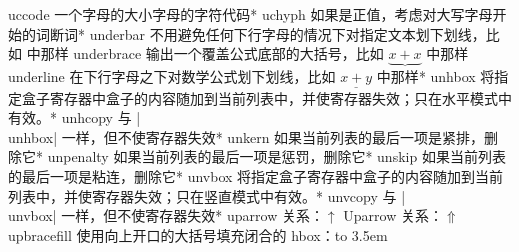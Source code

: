 \capcs uccode {一个字母的大小字母的字符代码}*{}
\capcs uchyph {如果是正值，考虑对大写字母开始的词断词}*{}
\capcs underbar {不用避免任何下行字母的情况下对指定文本划下划线，比如  中那样}{}{}
\capcs underbrace {输出一个覆盖公式底部的大括号，比如 $\underbrace{x+x}{}$ 中那样}{}{}
\capcs underline {在下行字母之下对数学公式划下划线，比如 $\underline{x+y}$ 中那样}*{}
\capcs unhbox {将指定盒子寄存器中盒子的内容随加到当前列表中，并使寄存器失效；只在水平模式中有效。}*{}
\capcs unhcopy {与 |\\unhbox| 一样，但不使寄存器失效}*{}
\capcs unkern {如果当前列表的最后一项是紧排，删除它}*{}
\capcs unpenalty {如果当前列表的最后一项是惩罚，删除它}*{}
\capcs unskip {如果当前列表的最后一项是粘连，删除它}*{}
\capcs unvbox {将指定盒子寄存器中盒子的内容随加到当前列表中，并使寄存器失效；只在竖直模式中有效。}*{}
\capcs unvcopy {与 |\\unvbox| 一样，但不使寄存器失效}*{}
\capcs uparrow {关系：$\uparrow$}{}{}
\capcs Uparrow {关系：$\Uparrow$}{}{}
\capcs upbracefill {使用向上开口的大括号填充闭合的 hbox：\hbox to 3.5em{\upbracefill}}{}{}
